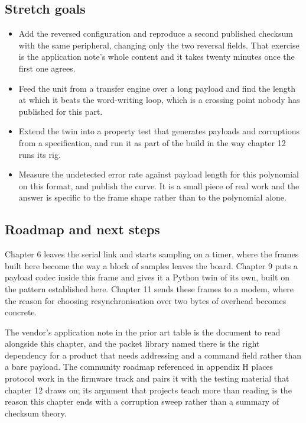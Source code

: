 \subsection*{Stretch goals}

\begin{itemize}
\item Add the reversed configuration and reproduce a second published checksum
with the same peripheral, changing only the two reversal fields. That exercise
is the application note's whole content and it takes twenty minutes once the
first one agrees.
\item Feed the unit from a transfer engine over a long payload and find the
length at which it beats the word-writing loop, which is a crossing point nobody
has published for this part.
\item Extend the twin into a property test that generates payloads and
corruptions from a specification, and run it as part of the build in the way
chapter 12 runs its rig.
\item Measure the undetected error rate against payload length for this
polynomial on this format, and publish the curve. It is a small piece of real
work and the answer is specific to the frame shape rather than to the
polynomial alone.
\end{itemize}

\subsection*{Roadmap and next steps}

Chapter 6 leaves the serial link and starts sampling on a timer, where the
frames built here become the way a block of samples leaves the board. Chapter 9
puts a payload codec inside this frame and gives it a Python twin of its own,
built on the pattern established here. Chapter 11 sends these frames to a modem,
where the reason for choosing resynchronisation over two bytes of overhead
becomes concrete.

The vendor's application note in the prior art table is the document to read
alongside this chapter, and the packet library named there is the right
dependency for a product that needs addressing and a command field rather than a
bare payload. The community roadmap referenced in appendix H places protocol
work in the firmware track and pairs it with the testing material that chapter
12 draws on; its argument that projects teach more than reading is the reason
this chapter ends with a corruption sweep rather than a summary of checksum
theory.

